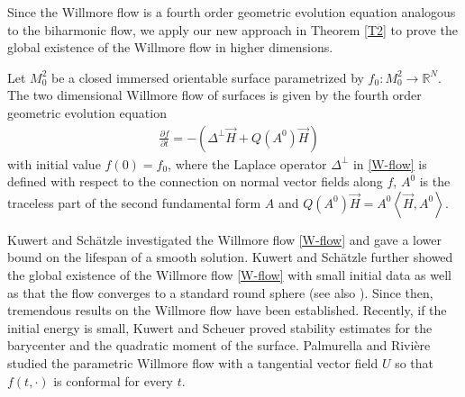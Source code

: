 \documentclass{amsart}
\theoremstyle{definition}
\numberwithin{equation}{section}
\begin{document}
Since the Willmore
flow is  a fourth order
geometric
evolution equation analogous to the biharmonic flow, we  apply our new approach   in Theorem \ref{T2} to   prove the global existence of the Willmore flow in higher dimensions.

Let $M^2_{0}$ be a closed  immersed  orientable surface  parametrized by $f_{0} : M_0^2 \rightarrow \mathbb{R}^{N}$.  The two dimensional  Willmore flow of  surfaces
is given by the fourth order geometric evolution equation
 \begin{align} \label{W-flow}
  &\frac{\partial f}{\partial t}  = -  \left(\Delta^\perp {\vec{H}} + Q(A^0)  {\vec{H}}\right)
\end{align}
with initial value $f \left( 0 \right)=f_{0}$, where the Laplace operator $\Delta^\perp$ in \eqref{W-flow} is defined with respect to
the connection on normal vector fields along $f$, $A^0$ is the traceless part of  the second fundamental form  $A$ and
$Q(A^0)\vec H=A^0\left <\vec H, A^0\right > $.

Kuwert and Sch\"atzle \cite{KS1}  investigated the Willmore
flow  \eqref{W-flow}  and gave a
lower bound on the lifespan of a smooth solution.   Kuwert and Sch\"atzle \cite{KS2} further showed   the global existence of the Willmore
flow \eqref{W-flow} with   small initial data
as well as that the flow converges to a standard
round sphere (see also \cite{S}). Since then,  tremendous results  on the Willmore flow have been established. Recently, if the initial energy
is small,   Kuwert and Scheuer \cite{KS3}   proved stability estimates for the barycenter and the quadratic moment of the surface. Palmurella
and   Rivi\`{e}re \cite{PR} studied  the parametric  Willmore flow with a
tangential vector field $U$  so that $f(t, \cdot )$ is conformal for every $t$.
\end{document}
